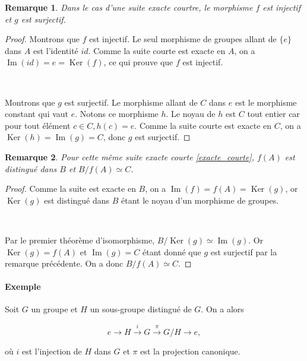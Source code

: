 \documentclass[french]{report}
\newtheorem*{remark}{Remarque}
\begin{document}
\begin{remark}\label{injectif_surjectif}
 Dans le cas d'une suite exacte courtre, le morphisme $f$ est injectif et $g$ est surjectif.
\end{remark}

\begin{proof}
  Montrons que $f$ est injectif. Le seul morphisme de groupes allant de $\{ e \} $ dans $A$ est l'identité $id$. Comme la suite courte est exacte en $A$, on a $\operatorname{Im}(id) = e = \operatorname{Ker}(f) $, ce qui prouve que $f$ est injectif.

 \

  Montrons que $g$ est surjectif. Le morphisme allant de $C$ dans $e $ est le morphisme constant qui vaut $e$. Notons ce morphisme $h$. Le noyau de $h$ est $C$ tout entier car pour tout élément $c \in C, h(c)=e$. Comme la suite courte est exacte en $C$, on a $\operatorname{Ker}(h)= \operatorname{Im}(g) = C$, donc $g$ est surjectif.
\end{proof}

\begin{remark}
  Pour cette même suite exacte courte \ref{exacte_courte}, $f(A)$ est distingué dans $B$ et $B/f(A) \simeq C$.
\end{remark}

\begin{proof}
  Comme la suite est exacte en $B$, on a $\operatorname{Im}(f) = f(A) = \operatorname{Ker}(g)$, or $\operatorname{Ker}(g) $ est distingué dans $B$ étant le noyau d'un morphisme de groupes.

  \

  Par le premier théorème d'isomorphisme, $B / \operatorname{Ker}(g) \simeq \operatorname{Im}(g)$. Or $\operatorname{Ker}(g) = f(A)$ et $\operatorname{Im}(g)=C$ étant donné que $g$ est surjectif par la remarque précédente. On a donc $B / f(A) \simeq C$.
\end{proof}

\paragraph{Exemple}

Soit $G$ un groupe et $H$ un sous-groupe distingué de $G$. On  a alors

$$ e \longrightarrow H \stackrel{i}{\longrightarrow} G \stackrel{\pi}{\longrightarrow} G/H \longrightarrow e,$$

où $i$ est l'injection de $H$ dans $G$ et $\pi$ est la projection canonique.
\end{document}
